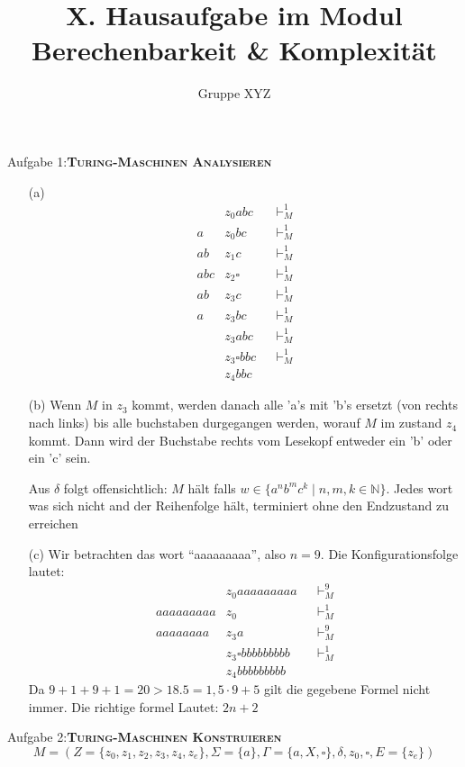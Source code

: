 \documentclass[a4paper,onecolumn,oneside,12pt,ngerman]{article}
\date{}
\title{X. Hausaufgabe im Modul \\ \glqq Berechenbarkeit \& Komplexität\grqq} %
\author{Gruppe XYZ} %
\theoremstyle{plain} %
\theoremstyle{definition} %
\theoremstyle{remark} %
\theoremstyle{plain}
\newcommand{\NN}{\mathbb{N}} %
\newcommand{\tstep}[1][1]{\vdash^#1_M} %
\begin{document}

\maketitle
\newpage
Aufgabe 1:\quad\textsc{\textbf{Turing-Maschinen Analysieren}}
\begin{enumerate}
    \item[(a)]
    \begin{align*}
    &z_0abc  &&\tstep  \\
    a&z_0bc   &&\tstep  \\
    ab&z_1c    &&\tstep  \\
    abc&z_2\square     &&\tstep  \\
    ab&z_3c    &&\tstep  \\
    a&z_3bc   &&\tstep  \\
    &z_3abc  &&\tstep  \\
    &z_3\square bbc  &&\tstep \\
    &z_4bbc
    \end{align*}
    
    \item[(b)] 
    Wenn $M$ in $z_3$ kommt, werden danach alle 'a's mit 'b's ersetzt (von rechts nach links) bis alle buchstaben durgegangen werden, worauf $M$ im zustand $z_4$ kommt. Dann wird der Buchstabe rechts vom Lesekopf entweder ein 'b' oder ein 'c' sein.

    Aus $\delta$ folgt offensichtlich: $M$ hält falls $w\in \{a^nb^mc^k\mid n,m,k \in \NN\}$. Jedes wort was sich nicht and der Reihenfolge hält, terminiert ohne den Endzustand zu erreichen
    \item[(c)] 
    Wir betrachten das wort \enquote{aaaaaaaaa}, also $n=9$. Die Konfigurationsfolge lautet:
    \begin{align*}
    &z_0aaaaaaaaa          &&\tstep[9]  \\
    aaaaaaaaa&z_0         &&\tstep  \\
    aaaaaaaa&z_3a         &&\tstep[9]  \\
    &z_3\square bbbbbbbbb  &&\tstep  \\
    &z_4bbbbbbbbb
\end{align*}
    Da $9+1+9+1 = 20 > 18.5 = 1,5\cdot 9 + 5$ gilt die gegebene Formel nicht immer. Die richtige formel Lautet: $2n+2$
\end{enumerate}
\newpage
Aufgabe 2:\quad \textsc{\textbf{Turing-Maschinen Konstruieren}}
\[ M = (Z = \{z_0, z_1, z_2, z_3, z_4, z_e\}, \Sigma = \{a\}, \Gamma = \{a,X,\square\},\delta, z_0, \square, E = \{z_e\}) \]
\end{document}
